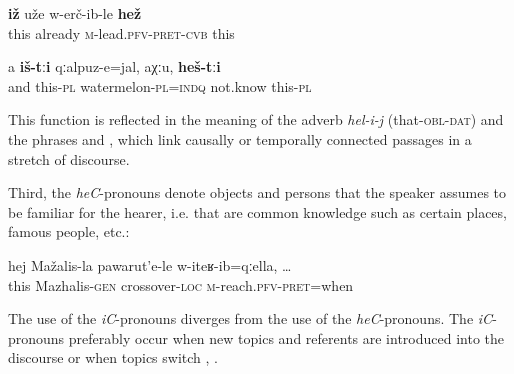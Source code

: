 \begin{exe}
	\ex	\label{They already carried him away}
	\gll	\textbf{iž}	uže	w-erč-ib-le	\textbf{hež} \\
		this	already	\textsc{m}-lead.\textsc{pfv}-\textsc{pret}-\textsc{cvb}	this\\
	\glt	{}
	
	\ex	\label{and these are watermelons, I don't know, these}
	\gll	a	\textbf{iš-tːi}	qːalpuz-e=jal,	aχːu,	\textbf{heš-tːi} \\
		and	this-\textsc{pl}	watermelon-\textsc{pl}=\textsc{indq}	not.know	this-\textsc{pl}\\
	\glt 	{}
\end{exe}


This function is reflected in the meaning of the adverb \textit{hel-i-j} (that-\textsc{obl}-\textsc{dat})  and the phrases   and  , which link causally or temporally connected passages in a stretch of discourse.

Third, the \textit{heC}-pronouns denote objects and persons that the speaker assumes to be familiar for the hearer, i.e. that are common knowledge such as certain places, famous people, etc.:

\begin{exe}
	\ex	\label{when I reached the crossover of Mazhalis}
	\gll	hej	Mažalis-la	pawarut'e-le	w-iteʁ-ib=qːella, \ldots\\
		this	Mazhalis-\textsc{gen}	crossover-\textsc{loc}	\textsc{m}-reach.\textsc{pfv}-\textsc{pret}=when\\
	\glt	{}
\end{exe}

The use of the \textit{iC}-pronouns diverges from the use of the \textit{heC}-pronouns. The \textit{iC}-pronouns preferably occur when new topics and referents are introduced into the discourse  or when topics switch , .

